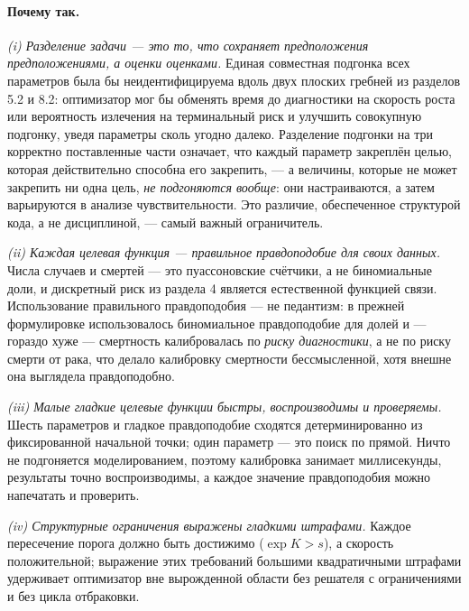 \documentclass[12pt,a4paper]{article}
\newcommand{\why}[1]{\paragraph{Почему так.} #1}
\begin{document}
\why{\emph{(i) Разделение задачи --- это то, что сохраняет предположения предположениями, а оценки
оценками.} Единая совместная подгонка всех параметров была бы неидентифицируема вдоль двух плоских гребней
из разделов 5.2 и 8.2: оптимизатор мог бы обменять время до диагностики на скорость роста или вероятность
излечения на терминальный риск и улучшить совокупную подгонку, уведя параметры сколь угодно далеко.
Разделение подгонки на три корректно поставленные части означает, что каждый параметр закреплён целью,
которая действительно способна его закрепить, --- а величины, которые не может закрепить ни одна цель,
\emph{не подгоняются вообще}: они настраиваются, а затем варьируются в анализе чувствительности. Это
различие, обеспеченное структурой кода, а не дисциплиной, --- самый важный ограничитель.

\emph{(ii) Каждая целевая функция --- правильное правдоподобие для своих данных.} Числа случаев и смертей
--- это пуассоновские счётчики, а не биномиальные доли, и дискретный риск из раздела 4 является естественной
функцией связи. Использование правильного правдоподобия --- не педантизм: в прежней формулировке
использовалось биномиальное правдоподобие для долей и --- гораздо хуже --- смертность калибровалась по
\emph{риску диагностики}, а не по риску смерти от рака, что делало калибровку смертности бессмысленной, хотя
внешне она выглядела правдоподобно.

\emph{(iii) Малые гладкие целевые функции быстры, воспроизводимы и проверяемы.} Шесть параметров и гладкое
правдоподобие сходятся детерминированно из фиксированной начальной точки; один параметр --- это поиск по
прямой. Ничто не подгоняется моделированием, поэтому калибровка занимает миллисекунды, результаты точно
воспроизводимы, а каждое значение правдоподобия можно напечатать и проверить.

\emph{(iv) Структурные ограничения выражены гладкими штрафами.} Каждое пересечение порога должно быть
достижимо ($\exp K > s$), а скорость положительной; выражение этих требований большими квадратичными
штрафами удерживает оптимизатор вне вырожденной области без решателя с ограничениями и без цикла отбраковки.}
\end{document}

